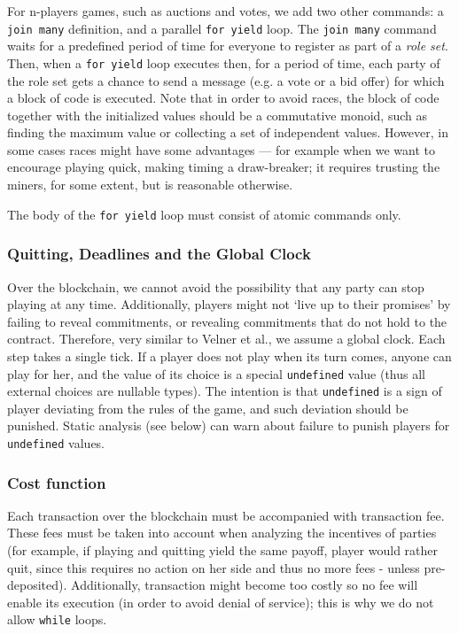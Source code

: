\documentclass[acmsmall,review,anonymous]{acmart}\settopmatter{printfolios=true,printccs=false,printacmref=false}
\begin{document}
For n-players games, such as auctions and votes, we add two other commands: a \texttt{join many} definition, and a parallel \texttt{for yield} loop. The \texttt{join many} command waits for a predefined period of time for everyone to register as part of a \textit{role set}. Then, when a \texttt{for yield} loop executes then, for a period of time, each party of the role set gets a chance to send a message (e.g. a vote or a bid offer) for which a block of code is executed. Note that in order to avoid races, the block of code together with the initialized values should be a commutative monoid, such as finding the maximum value or collecting a set of independent values. However, in some cases races might have some advantages --- for example when we want to encourage playing quick, making timing a draw-breaker; it requires trusting the miners, for some extent, but is reasonable otherwise.

The body of the \texttt{for yield} loop must consist of atomic commands only.

\subsubsection{Quitting, Deadlines and the Global Clock}
Over the blockchain, we cannot avoid the possibility that any party can stop playing at any time. Additionally, players might not `live up to their promises' by failing to reveal commitments, or revealing commitments that do not hold to the contract.
Therefore, very similar to Velner et al., we assume a global clock. Each step takes a single tick. If a player does not play when its turn comes, anyone can play for her, and the value of its choice is a special \texttt{undefined} value (thus all external choices are nullable types). The intention is that \texttt{undefined} is a sign of player deviating from the rules of the game, and such deviation should be punished. Static analysis (see below) can warn about failure to punish players for \texttt{undefined} values.

\subsubsection{Cost function}
Each transaction over the blockchain must be accompanied with transaction fee. These fees must be taken into account when analyzing the incentives of parties (for example, if playing and quitting yield the same payoff, player would rather quit, since this requires no action on her side and thus no more fees - unless pre-deposited). Additionally, transaction might become too costly so no fee will enable its execution (in order to avoid denial of service); this is why we do not allow \texttt{while} loops.
\end{document}
